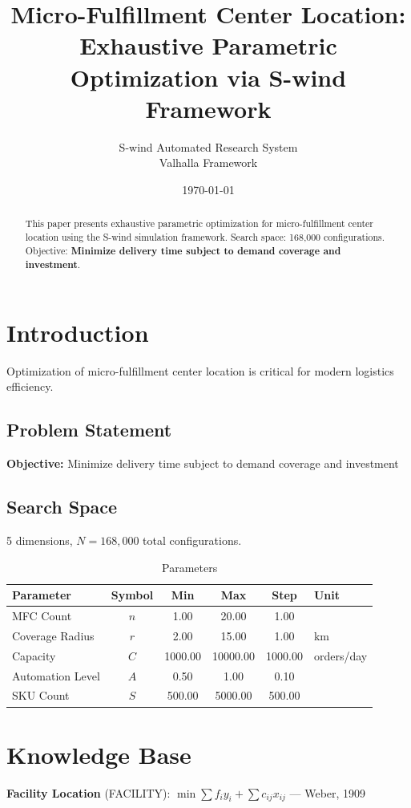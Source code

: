 \documentclass[11pt,twocolumn]{article}
\title{Micro-Fulfillment Center Location: \\Exhaustive Parametric Optimization via S-wind Framework}
\author{S-wind Automated Research System\\Valhalla Framework}
\date{\today}
\begin{document}
\maketitle

\begin{abstract}
This paper presents exhaustive parametric optimization for micro-fulfillment center location using the S-wind simulation framework.
Search space: 168,000 configurations. Objective: \textbf{Minimize delivery time subject to demand coverage and investment}.
\end{abstract}

\section{Introduction}
Optimization of micro-fulfillment center location is critical for modern logistics efficiency.

\subsection{Problem Statement}
\textbf{Objective:} Minimize delivery time subject to demand coverage and investment

\subsection{Search Space}
5 dimensions, $N = 168,000$ total configurations.

\begin{table}[h]
\centering
\caption{Parameters}
\begin{tabular}{@{}lccccl@{}}
\toprule
Parameter & Symbol & Min & Max & Step & Unit \\
\midrule
MFC Count & $n$ & 1.00 & 20.00 & 1.00 &  \\
Coverage Radius & $r$ & 2.00 & 15.00 & 1.00 & km \\
Capacity & $C$ & 1000.00 & 10000.00 & 1000.00 & orders/day \\
Automation Level & $A$ & 0.50 & 1.00 & 0.10 &  \\
SKU Count & $S$ & 500.00 & 5000.00 & 500.00 &  \\
\bottomrule
\end{tabular}
\end{table}

\section{Knowledge Base}
\textbf{Facility Location} (FACILITY): $\min \sum f_i y_i + \sum c_{ij} x_{ij}$ --- Weber, 1909
\end{document}
